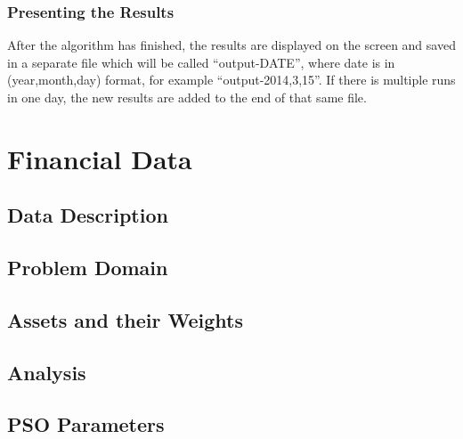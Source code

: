 \documentclass{pdfmx4020}
\begin{document}
    \subsection{Presenting the Results} %
    \label{sub:presenting_the_results}
    After the algorithm has finished, the results are displayed on the screen and saved in a separate file which will be called ``output-DATE'', where date is in (year,month,day) format, for example ``output-2014,3,15''. If there is multiple runs in one day, the new results are added to the end of that same file.


\chapter{Financial Data}
  \section{Data Description} %
  \label{sec:data_description}
  

  \section{Problem Domain} %
  \label{sec:problem_domain}
  

  \section{Assets and their Weights} %
  \label{sec:assets_and_their_weights}
  

  \section{Analysis} %
  \label{sec:analysis}
  

  \section{PSO Parameters} %
  \label{sec:pso_parameters}
  
\end{document}

